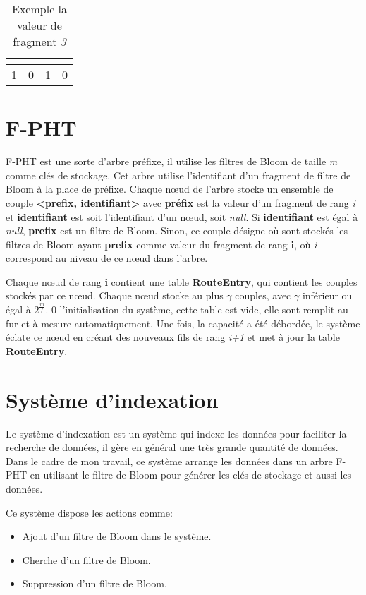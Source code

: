 \documentclass[a4paper,11pt]{report}
\begin{document}
	\begin{table}[!h]
		\centering
		\begin{tabular}{|l|c|c|r|}
		\multicolumn{1}{c}{}&\multicolumn{1}{c}{}&\multicolumn{1}{c}{}\\
		\hline
			1 & 0 & 1 & 0 \\
		\hline
		\end{tabular}
		\caption{Exemple la valeur de fragment \textit{3}}
		\label{fragement/exemple2}
	\end{table}
	
\section{F-PHT}
	F-PHT est une sorte d'arbre préfixe, il utilise  les filtres de Bloom  de taille \textit{m} comme clés de stockage. Cet arbre utilise l'identifiant d'un fragment de filtre de Bloom à la place de préfixe. Chaque nœud de l'arbre stocke un ensemble de couple \textbf{<prefix, identifiant>} avec \textbf{préfix} est la valeur d'un fragment de rang \textit{i} et \textbf{identifiant} est soit l'identifiant d'un nœud, soit \textit{null}. Si \textbf{identifiant} est égal à \textit{null}, \textbf{prefix} est un filtre de Bloom. Sinon, ce couple désigne où sont stockés les filtres de Bloom ayant \textbf{prefix} comme valeur du fragment de rang \textbf{i}, où \textit{i} correspond au niveau de ce nœud dans l'arbre.

	Chaque nœud de rang \textbf{i} contient une table \textbf{RouteEntry}, qui contient les couples stockés par ce nœud. Chaque nœud stocke au plus $\gamma$ couples, avec $\gamma$ inférieur ou égal à $2^{\frac{m}{f}}$. 0 l'initialisation du système, cette table est vide, elle sont remplit au fur et à mesure automatiquement. Une fois, la capacité a été débordée, le système éclate ce nœud en créant des nouveaux fils de rang \textit{i+1} et met à jour la table \textbf{RouteEntry}.
	
\section{Système d'indexation}
	Le système d'indexation est un système qui indexe les données pour faciliter la recherche de données, il gère en général une très grande quantité de données. Dans le cadre de mon travail, ce système arrange les données dans un arbre F-PHT en utilisant le filtre de Bloom pour générer les clés de stockage et aussi les données.
	
	Ce système dispose les actions comme:
	\begin{itemize}
		\item Ajout d'un filtre de Bloom dans le système.
		\item Cherche d'un filtre de Bloom.
		\item Suppression d'un filtre de Bloom.
	\end{itemize}
	
\end{document}
